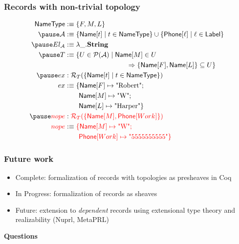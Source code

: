 \documentclass[tikz, 12pt]{beamer}
\begin{document}
\begin{frame}
  \frametitle{Records with non-trivial topology}\pause
  \[
    \begin{aligned}
      \mathsf{NameType} &:\equiv \{ F, M, L \}\\\pause
      \mathcal{A} &:\equiv \{ \mathsf{Name}[t] \mid t\in\mathsf{NameType}\}
        \cup
        \{ \mathsf{Phone}[\ell] \mid \ell\in\mathsf{Label} \}\\\pause
      El_\mathcal{A} &:\equiv \lambda\_. \mathbf{String}\\\pause
      T &:\equiv \{ U\in\mathcal{P}(\mathcal{A}) \mid \mathsf{Name}[M]\in U\\&\hspace{90pt}\Rightarrow \{\mathsf{Name}[F],\mathsf{Name}[L]\}\subseteq U\}\\\pause
      ex &: \mathcal{R}_T(\{\mathsf{Name}[t]\mid t\in\mathsf{NameType}\})\\
      ex &:\equiv
        \{\mathsf{Name}[F]\mapsto \text{"Robert"};\\
          &\qquad \mathsf{Name}[M]\mapsto\text{"W"};\\
          &\qquad \mathsf{Name}[L]\mapsto\text{"Harper"}\}\\\pause
      \color{red}{nope} &: \color{red}{\mathcal{R}_T(\{\mathsf{Name}[M],\mathsf{Phone}[Work]\})}\\
      \color{red}{nope} &:\equiv\color{red}{\{\mathsf{Name}[M]\mapsto\text{"W"};}\\
          &\qquad \color{red}{\mathsf{Phone}[Work]\mapsto\text{"5555555555"}\}}
    \end{aligned}
  \]
\end{frame}

\begin{frame}
  \frametitle{Future work}\pause
  \begin{itemize}
    \item Complete: formalization of records with topologies as presheaves in Coq\pause
    \item In Progress: formalization of records as sheaves\pause
    \item Future: extension to \emph{dependent} records using extensional type theory and realizability (Nuprl, MetaPRL)
  \end{itemize}
\end{frame}

\begin{frame}
  \centerline{\textbf{Questions}}
\end{frame}
\end{document}
